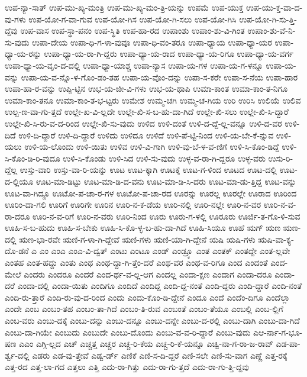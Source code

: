 {ಉಪ-ನ್ಯಾ-ಸಾತ್
ಉಪ-ಮು-ಖ್ಯ-ಮಂತ್ರಿ
ಉಪ-ಮು-ಖ್ಯ-ಮಂ-ತ್ರಿ-ಯನ್ನು
ಉಪಮೆ
ಉಪ-ಯುಕ್ತ
ಉಪ-ಯು-ಕ್ತ-ವಾ-ದ-ವು-ಗಳು
ಉಪ-ಯೋ-ಗ-ವಾ-ಗುವ
ಉಪ-ಯೋ-ಗಿಸ
ಉಪ-ಯೋ-ಗಿ-ಸಲು
ಉಪ-ಯೋ-ಗಿಸಿ
ಉಪ-ಯೋ-ಗಿ-ಸು-ತ್ತಿ-ದ್ದೆವು
ಉಪ-ವಾಸ
ಉಪ-ಸ್ಥಾ-ಪನಂ
ಉಪ-ಸ್ಥಿತಿ
ಉಪ-ಹಾ-ರದ
ಉಪಾಂಶು
ಉಪಾಂ-ಶು-ವಿ-ಗಿಂತ
ಉಪಾಂ-ಶು-ವೆ-ನಿ-ಸು-ವುದು
ಉಪಾ-ದೇಯ
ಉಪಾ-ಧಿ-ಗ-ಳಾ-ವುವೂ
ಉಪಾ-ಧಿ-ವಂ-ತರೂ
ಉಪಾ-ಧ್ಯಾಯ
ಉಪಾ-ಧ್ಯಾ-ಯರ
ಉಪಾ-ಧ್ಯಾ-ಯ-ರನ್ನು
ಉಪಾ-ಧ್ಯಾ-ಯ-ರಾ-ಗಿ-ದ್ದರು
ಉಪಾ-ಧ್ಯಾ-ಯ-ರಾದ
ಉಪಾ-ಧ್ಯಾ-ಯ-ರಿಗೂ
ಉಪಾ-ಧ್ಯಾ-ಯ-ವರ್ಗ
ಉಪಾ-ಧ್ಯಾ-ಯ-ವೃಂ-ದ-ದಲ್ಲಿ
ಉಪಾ-ಧ್ಯಾ-ಯಾಶ್ಚ
ಉಪಾ-ನ್ಯಾಸ
ಉಪಾ-ಯ-ಗಳ
ಉಪಾ-ಯ-ಗ-ಳನ್ನೂ
ಉಪಾ-ಯ-ವನ್ನು
ಉಪಾ-ಯ-ವ-ನ್ನೊ-ಳ-ಗೊಂ-ಡಂ-ತಹ
ಉಪಾ-ಯ-ವೊಂ-ದನ್ನು
ಉಪಾ-ಸ-ಕರೇ
ಉಪಾ-ಸ-ನೆಯ
ಉಪಾ-ಹಾರ
ಉಪಾ-ಹಾ-ರ-ವನ್ನು
ಉಪ್ಪಿ-ಟ್ಟಿನ
ಉಭ-ಯ-ಜೀ-ವಿ-ಗಳು
ಉಭ-ಯ-ಥಾಪಿ
ಉಮಾ-ಕಾಂತ
ಉಮಾ-ಕಾಂ-ತ-ನಿಗೂ
ಉಮಾ-ಕಾಂ-ತನೂ
ಉಮಾ-ಕಾಂ-ತ-ಭ-ಟ್ಟರು
ಉಮೇಶ
ಉಮ್ಮ-ಚಗಿ
ಉಮ್ಮ-ಚ-ಗಿಯ
ಉರಿ
ಉರಿಸಿ
ಉಲಿಯೆ
ಉಲಿವ
ಉಲ್ಬ-ಣ-ವಾ-ಗು-ತ್ತದೆ
ಉಲ್ಲೇ-ಖ-ವಿ-ಲ್ಲದೇ
ಉಲ್ಲೇ-ಖಿ-ಸ-ಬ-ಹು-ದಾ-ಗಿದೆ
ಉಲ್ಲೇ-ಖಿ-ಸಲು
ಉಲ್ಲೇ-ಖಿ-ಸಿ-ದ್ದಾರೆ
ಉಲ್ಲೇ-ಖಿ-ಸಿ-ರು-ವ-ದ-ರಿಂದ
ಉಲ್ಲೇ-ಖಿ-ಸು-ವುದು
ಉಳಿದ
ಉಳಿ-ದಂತೆ
ಉಳಿ-ದ-ದ್ದೆ-ಲ್ಲ-ವನ್ನೂ
ಉಳಿ-ದ-ವರ
ಉಳಿ-ದಿದೆ
ಉಳಿ-ದಿ-ದ್ದಾರೆ
ಉಳಿ-ದಿ-ದ್ದಾರೆ
ಉಳಿದು
ಉಳಿದೂ
ಉಳಿದೆ
ಉಳಿ-ಪೆ-ಟ್ಟಿ-ನಿಂದ
ಉಳಿ-ಯ-ಬೇ-ಕೆ-ನ್ನುವ
ಉಳಿ-ಯಲು
ಉಳಿ-ಯ-ಲೊಂದು
ಉಳಿ-ಯಿತು
ಉಳಿವ
ಉಳಿ-ವಿ-ಗಾಗಿ
ಉಳಿ-ವು-ಬೆ-ಳ-ವ-ಣಿಗೆ
ಉಳಿ-ಸಿ-ಕೊಂ-ಡಿದ್ದೆ
ಉಳಿ-ಸಿ-ಕೊಂ-ಡಿ-ರಿ-ವುದೂ
ಉಳಿ-ಸಿ-ಕೊಂಡು
ಉಳಿ-ಸಿದ
ಉಳಿ-ಸು-ವುದು
ಉಳ್ಳ-ವ-ರಾ-ಗಿ-ದ್ದರೂ
ಉಳ್ಳ-ವರು
ಉಸು-ರಿ-ದ್ದೆಲ್ಲ
ಉಸ್ತು-ವಾರಿ
ಉಸ್ತು-ವಾ-ರಿ-ಯನ್ನು
ಊಟ
ಊಟ-ಕ್ಕಾಗಿ
ಊಟಕ್ಕೆ
ಊಟ-ಗ-ಳಿಂದ
ಊಟದ
ಊಟ-ದಲ್ಲಿ
ಊಟ-ದ-ಲ್ಲಿಯೂ
ಊಟ-ಮಾ-ಡಿಟ್ಟು
ಊಟ-ಮಾ-ಡಿ-ದ-ವನು
ಊಟ-ಮಾ-ಡಿ-ಸಿ-ದರು
ಊಟ-ಮಾ-ಡು-ತ್ತಿದ್ದ
ಊಟ-ವನ್ನು
ಊಟ-ವಾ-ಗಿದ್ದೂ
ಊಟೋ-ಪ-ಚಾ-ರ-ಗಳ
ಊಟೋ-ಪ-ಚಾ-ರದ
ಊರನ್ನು
ಊರಲ್ಲ
ಊರಲ್ಲೇ
ಊರಾದ
ಊರಿಂದ
ಊರಿಂ-ದಾ-ಗಲಿ
ಊರಿಗೆ
ಊರಿಗೇ
ಊರಿನ
ಊರಿ-ನ-ಕ-ಡೆಯ
ಊರಿ-ನಲ್ಲಿ
ಊರಿ-ನಲ್ಲೇ
ಊರಿ-ನ-ವರ
ಊರಿ-ನ-ವ-ರಾ-ದರೂ
ಊರಿ-ನ-ವ-ರಿಗೆ
ಊರಿ-ನ-ವರು
ಊರಿ-ನಿಂದ
ಊರು
ಊರು-ಗ-ಳಲ್ಲಿ
ಊರೂರು
ಊರ್ಜಿ-ತ-ಗೊ-ಳಿ-ಸುವ
ಊಹಿ-ಸ-ಬ-ಹುದು
ಊಹಿ-ಸ-ಬೇಕು
ಊಹಿ-ಸಿ-ಕೊ-ಳ್ಳ-ಬ-ಹು-ದಾ-ಗಿದೆ
ಊಹಿ-ಸಿಯೂ
ಊಹೆ
ಋಗ್
ಋಣ
ಋಣ-ದಲ್ಲಿ
ಋಣ-ಭಾ-ರವೇ
ಋಣಿ-ಗ-ಳಾ-ಗಿ-ದ್ದೇವೆ
ಋಣಿ-ಗಳು
ಋಣಿ-ಯಾ-ಗಿ-ದ್ದೇನೆ
ಋಷಿ
ಋಷಿ-ಗಳು
ಋಷಿ-ವಾ-ಕ್ಯ-ದೊ-ಡನೆ
ಎ
ಎಂ
ಎಂಎ
ಎಂಎ-ವಿ-ದ್ವತ್
ಎಂಟು
ಎಂಟೂ
ಎಂಡ್
ಎಂಡ್ರ್ಯೂ
ಎಂತ
ಎಂತಕ್
ಎಂತದ್ದೇ
ಎಂತ-ಲ್ಲವೇ
ಎಂತಹ
ಎಂತ-ಹದ್ದು
ಎಂತು
ಎಂಥ
ಎಂಥ-ದ್ದಾ-ಗಿ-ತ್ತೆಂ-ದರೆ
ಎಂಥ-ವರ
ಎಂಥ-ವ-ರಿಗೂ
ಎಂದ
ಎಂದಂತೆ
ಎಂದ-ಮೇಲೆ
ಎಂದರು
ಎಂದರೂ
ಎಂದರೆ
ಎಂದ-ರ್ಥ-ವ-ಲ್ಲ-ಆಗ
ಎಂದಲ್ಲ
ಎಂದಾ-ಕ್ಷಣ
ಎಂದಾಗ
ಎಂದಾ-ದರೂ
ಎಂದಾ-ದರೆ
ಎಂದಾ-ದಲ್ಲಿ
ಎಂದಾ-ಯಿತು
ಎಂದಿಗೂ
ಎಂದಿದೆ
ಎಂದಿದ್ದ
ಎಂದಿ-ದ್ದ-ನಂತೆ
ಎಂದಿ-ದ್ದರು
ಎಂದಿ-ದ್ದಾರೆ
ಎಂದಿ-ನಂತೆ
ಎಂದಿ-ರು-ತ್ತಾರೆ
ಎಂದಿ-ರು-ವು-ದ-ರಿಂದ
ಎಂದು
ಎಂದು-ಕೊಂ-ಡಿ-ದ್ದೇನೆ
ಎಂದೂ
ಎಂದೆ
ಎಂದೆಂ-ದಿಗೂ
ಎಂದೆಲ್ಲಾ
ಎಂದೇ
ಎಂಬ
ಎಂಬಂ-ತಹ
ಎಂಬಂ-ತಾ-ಗಿದೆ
ಎಂಬಂ-ತಿ-ರುವ
ಎಂಬಂತೆ
ಎಂಬಂ-ತೆಯೂ
ಎಂಬಲ್ಲಿ
ಎಂಬ-ಲ್ಲಿಗೆ
ಎಂಬ-ವರು
ಎಂಬು-ದಕ್ಕೆ
ಎಂಬು-ದನ್ನು
ಎಂಬು-ದನ್ನೂ
ಎಂಬು-ದನ್ನೇ
ಎಂಬು-ದ-ರಲ್ಲಿ
ಎಂಬು-ದಾಗಿ
ಎಂಬು-ದಾ-ಗಿದೆ
ಎಂಬು-ದಾ-ಗಿಯೇ
ಎಂಬುದು
ಎಂಬುದೇ
ಎಂಬು-ದೊಂದು
ಎಂಬು-ವ-ವ-ರಿ-ದ್ದಾರೆ
ಎಂಬು-ವುದು
ಎಆ-ರ್ನಾ-ಗ-ಭೂ-ಷಣ
ಎಎಂ
ಎಗ್ಗಿ-ಲ್ಲದ
ಎಚ್
ಎಚ್ಚತ್ತ
ಎಚ್ಚರ
ಎಚ್ಚ-ರಿ-ಕೆಯ
ಎಚ್ಚ-ರಿ-ಕೆ-ಯನ್ನೂ
ಎಚ್ವಿ-ನಾ-ಗ-ರಾ-ಜ-ರಾವ್
ಎಡ-ಪಾ-ರ್ಶ್ವ-ದಲ್ಲಿ
ಎಡರು
ಎಡ-ವು-ತ್ತೇವೆ
ಎಡ್ವ-ರ್ಡ್
ಎಣಿಕೆ
ಎಣಿ-ಸ-ದಿ-ದ್ದರೆ
ಎಣಿ-ಸಲೇ
ಎಣಿ-ಸು-ವಾಗ
ಎಣ್ಣೆ
ಎತ್ತ-ರಕ್ಕೆ
ಎತ್ತ-ರದ
ಎತ್ತ-ಲಾ-ಗದ
ಎತ್ತಲು
ಎತ್ತಿ
ಎದು-ರಾ-ಗಿತ್ತು
ಎದು-ರಾ-ಗು-ತ್ತದೆ
ಎದು-ರಾ-ಗು-ತ್ತಿ-ದ್ದವು
}
